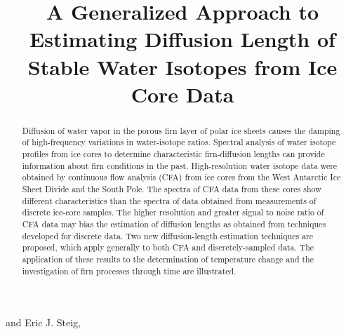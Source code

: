 \documentclass[draft, jgrga]{AGUTeX}
\begin{document}

\title{A Generalized Approach to Estimating Diffusion Length of Stable Water Isotopes from Ice Core Data}




 and Eric J. Steig,






\begin{abstract}

Diffusion of water vapor in the porous firn layer of polar ice sheets causes the damping of high-frequency variations in water-isotope ratios. Spectral analysis of water isotope profiles from ice cores to determine characteristic firn-diffusion lengths can provide information about firn conditions in the past. High-resolution water isotope data were obtained by continuous flow analysis (CFA) from ice cores from the West Antarctic Ice Sheet Divide and the South Pole. The spectra of CFA data from these cores show different characteristics than the spectra of data obtained from measurements of discrete ice-core samples.  The higher resolution and greater signal to noise ratio of CFA data may bias the estimation of diffusion lengths as obtained from techniques developed for discrete data. Two new diffusion-length estimation techniques are proposed, which apply generally to both CFA and discretely-sampled data. The application of these results to the determination of temperature change and the investigation of firn processes through time are illustrated.

\end{abstract}
\end{document}
